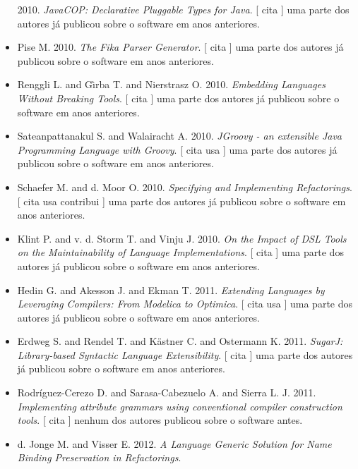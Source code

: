 \begin{itemize}
      2010.
        \textit{ JavaCOP: Declarative Pluggable Types for Java}.
      [
          cita
      ]
uma parte dos autores já publicou sobre o software em anos anteriores.
\item Pise M.
      2010.
        \textit{ The Fika Parser Generator}.
      [
          cita
      ]
uma parte dos autores já publicou sobre o software em anos anteriores.
\item Renggli L. and G\^{\i}rba T. and Nierstrasz O.
      2010.
        \textit{ Embedding Languages Without Breaking Tools}.
      [
          cita
      ]
uma parte dos autores já publicou sobre o software em anos anteriores.
\item Sateanpattanakul S. and Walairacht A.
      2010.
        \textit{ JGroovy - an extensible Java Programming Language with Groovy}.
      [
          cita
          usa
      ]
uma parte dos autores já publicou sobre o software em anos anteriores.
\item Schaefer M. and d. Moor O.
      2010.
        \textit{ Specifying and Implementing Refactorings}.
      [
          cita
          usa
          contribui
      ]
uma parte dos autores já publicou sobre o software em anos anteriores.
\item Klint P. and v. d. Storm T. and Vinju J.
      2010.
        \textit{ On the Impact of DSL Tools on the Maintainability of Language Implementations}.
      [
          cita
      ]
uma parte dos autores já publicou sobre o software em anos anteriores.
\item Hedin G. and Akesson J. and Ekman T.
      2011.
        \textit{ Extending Languages by Leveraging Compilers: From Modelica to Optimica}.
      [
          cita
          usa
      ]
uma parte dos autores já publicou sobre o software em anos anteriores.
\item Erdweg S. and Rendel T. and K\"{a}stner C. and Ostermann K.
      2011.
        \textit{ SugarJ: Library-based Syntactic Language Extensibility}.
      [
          cita
      ]
uma parte dos autores já publicou sobre o software em anos anteriores.
\item Rodríguez-Cerezo D. and Sarasa-Cabezuelo A. and Sierra L. J.
      2011.
        \textit{ Implementing attribute grammars using conventional compiler construction tools}.
      [
          cita
      ]
nenhum dos autores publicou sobre o software antes.
\item d. Jonge M. and Visser E.
      2012.
        \textit{ A Language Generic Solution for Name Binding Preservation in Refactorings}.

\end{itemize}
